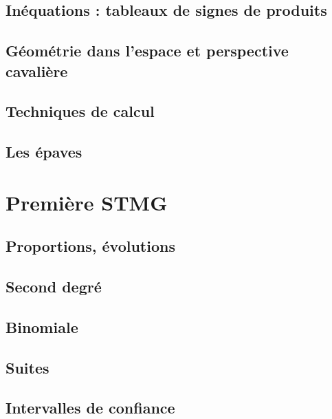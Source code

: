 \documentclass[a4paper,12pt]{book}
\begin{document}
\chapter{Inéquations : tableaux de signes de produits}


\chapter{Géométrie dans l'espace et perspective cavalière}


\chapter{Techniques de calcul}


\chapter{Les épaves}


\part{Première STMG}
\chapter{Proportions, évolutions}


\chapter{Second degré}


\chapter{Binomiale}


\chapter{Suites}


\chapter{Intervalles de confiance}

\end{document}
